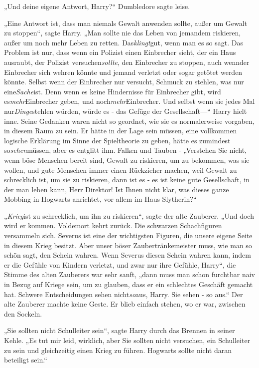 {„Und deine eigene Antwort, Harry?“ Dumbledore sagte leise.

„Eine Antwort ist, dass man niemals Gewalt anwenden sollte, außer um Gewalt zu stoppen“, sagte Harry. „Man sollte nie das Leben von jemandem riskieren, außer um noch mehr Leben zu retten. Das\emph{klingt}gut, wenn man es so sagt. Das Problem ist nur, dass wenn ein Polizist einen Einbrecher sieht, der ein Haus ausraubt, der Polizist versuchen\emph{sollte}, den Einbrecher zu stoppen, auch wennder Einbrecher sich wehren könnte und jemand verletzt oder sogar getötet werden könnte. Selbst wenn der Einbrecher nur versucht, Schmuck zu stehlen, was nur eine\emph{Sache}ist. Denn wenn es keine Hindernisse für Einbrecher gibt, wird es\emph{mehr}Einbrecher geben, und noch\emph{mehr}Einbrecher. Und selbst wenn sie jedes Mal nur\emph{Dinge}stehlen würden, würde es - das Gefüge der Gesellschaft—“ Harry hielt inne. Seine Gedanken waren nicht so geordnet, wie sie es normalerweise vorgaben, in diesem Raum zu sein. Er hätte in der Lage sein müssen, eine vollkommen logische Erklärung im Sinne der Spieltheorie zu geben, hätte es zumindest so\emph{sehen}müssen, aber es entglitt ihm. Falken und Tauben - „Verstehen Sie nicht, wenn böse Menschen bereit sind, Gewalt zu riskieren, um zu bekommen, was sie wollen, und gute Menschen immer einen Rückzieher machen, weil Gewalt zu schrecklich ist, um sie zu riskieren, dann ist es - es ist keine gute Gesellschaft, in der man leben kann, Herr Direktor! Ist Ihnen nicht klar, was dieses ganze Mobbing in Hogwarts anrichtet, vor allem im Haus Slytherin?“

„\emph{Krieg}ist zu schrecklich, um ihn zu riskieren“, sagte der alte Zauberer. „Und doch wird er kommen. Voldemort kehrt zurück. Die schwarzen Schachfiguren versammeln sich. Severus ist eine der wichtigsten Figuren, die unsere eigene Seite in diesem Krieg besitzt. Aber unser böser Zaubertränkemeister muss, wie man so schön sagt, den Schein wahren. Wenn Severus diesen Schein wahren kann, indem er die Gefühle von Kindern verletzt, und zwar nur ihre Gefühle, Harry“, die Stimme des alten Zauberers war sehr sanft, „dann muss man schon furchtbar naiv in Bezug auf Kriege sein, um zu glauben, dass er ein schlechtes Geschäft gemacht hat. Schwere Entscheidungen sehen nicht\emph{so}aus, Harry. Sie sehen - so aus.“ Der alte Zauberer machte keine Geste. Er blieb einfach stehen, wo er war, zwischen den Sockeln.

„Sie sollten nicht Schulleiter sein“, sagte Harry durch das Brennen in seiner Kehle. „Es tut mir leid, wirklich, aber Sie sollten nicht versuchen, ein Schulleiter zu sein und gleichzeitig einen Krieg zu führen. Hogwarts sollte nicht daran beteiligt sein.“

}
